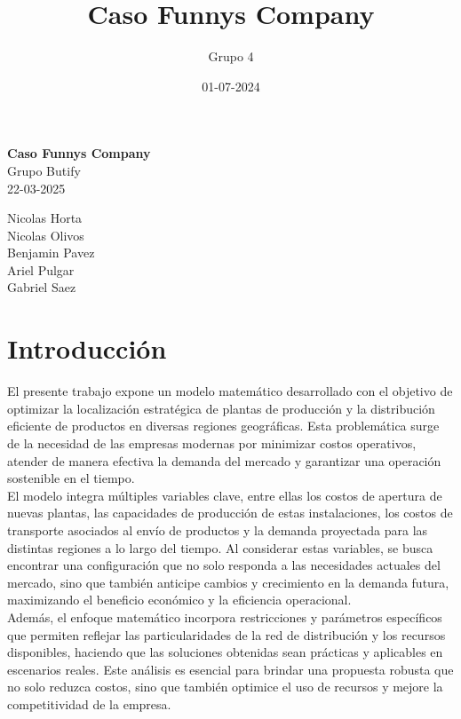 \documentclass[a4paper]{article}
\title{Caso Funnys Company}
\author{Grupo 4}
\date{01-07-2024}
\begin{document}
    \begin{titlepage}
        \centering
        \vspace*{3cm}
        \LARGE
        \textbf{Caso Funnys Company}\\[1cm] 
        \Large
        Grupo Butify\\[1cm] 
        \normalsize
        22-03-2025
        \vfill
        \hspace*{\fill}
        \begin{minipage}[t]{0.4\textwidth}
            \raggedleft
            \small
            Nicolas Horta\\
            Nicolas Olivos\\
            Benjamin Pavez\\
            Ariel Pulgar\\
            Gabriel Saez
        \end{minipage}
    \end{titlepage}

    \section{Introducci\'on}
    El presente trabajo expone un modelo matem\'atico desarrollado con el objetivo de optimizar la localizaci\'on estrat\'egica de plantas de producci\'on y la distribuci\'on eficiente de productos en diversas regiones geogr\'aficas. Esta problem\'atica surge de la necesidad de las empresas modernas por minimizar costos operativos, atender de manera efectiva la demanda del mercado y garantizar una operaci\'on sostenible en el tiempo.\\

    El modelo integra múltiples variables clave, entre ellas los costos de apertura de nuevas plantas, las capacidades de producción de estas instalaciones, los costos de transporte asociados al envío de productos y la demanda proyectada para las distintas regiones a lo largo del tiempo. Al considerar estas variables, se busca encontrar una configuración que no solo responda a las necesidades actuales del mercado, sino que también anticipe cambios y crecimiento en la demanda futura, maximizando el beneficio económico y la eficiencia operacional.\\
    
    Además, el enfoque matemático incorpora restricciones y parámetros específicos que permiten reflejar las particularidades de la red de distribución y los recursos disponibles, haciendo que las soluciones obtenidas sean prácticas y aplicables en escenarios reales. Este análisis es esencial para brindar una propuesta robusta que no solo reduzca costos, sino que también optimice el uso de recursos y mejore la competitividad de la empresa.\\
    
\end{document}
